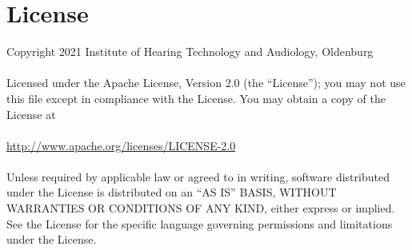 \documentclass[11pt,a4paper,titlepage]{article}
\newcommand{\Institute}{Institute of Hearing Technology and Audiology, Oldenburg}
\begin{document}
\clearpage

 
\section{License}

 Copyright 2021 \Institute\\
\\
   Licensed under the Apache License, Version 2.0 (the ``License'');
   you may not use this file except in compliance with the License.
   You may obtain a copy of the License at\\
\\
	 \url{http://www.apache.org/licenses/LICENSE-2.0}\\
\\
   Unless required by applicable law or agreed to in writing, software
   distributed under the License is distributed on an ``AS IS'' BASIS,
   WITHOUT WARRANTIES OR CONDITIONS OF ANY KIND, either express or implied.
   See the License for the specific language governing permissions and
   limitations under the License.
\end{document}
